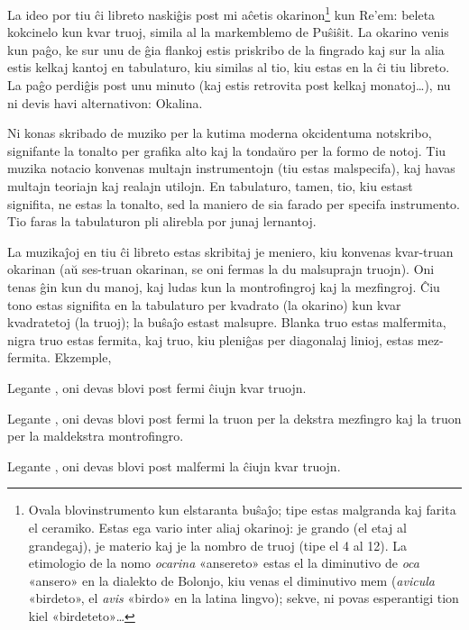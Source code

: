 
La ideo por tiu ĉi libreto naskiĝis post mi aĉetis okarinon\footnote{Ovala blovinstrumento kun elstaranta buŝaĵo; tipe estas malgranda kaj farita el ceramiko. Estas ega vario inter aliaj okarinoj: je grando (el etaj al grandegaj), je materio kaj je la nombro de truoj (tipe el 4 al 12). La etimologio de la nomo \emph{ocarina} «ansereto» estas el la diminutivo de \emph{oca} «ansero» en la dialekto de Bolonjo, kiu venas el diminutivo mem (\emph{avicula} «birdeto», el \emph{avis} «birdo» en la latina lingvo); sekve, ni povas esperantigi tion kiel «birdeteto»…} kun Re’em: beleta kokcinelo kun kvar truoj, simila al la markemblemo de Puŝiŝit. La okarino venis kun paĝo, ke sur unu de ĝia flankoj estis priskribo de la fingrado kaj sur la alia estis kelkaj kantoj en tabulaturo, kiu similas al tio, kiu estas en la ĉi tiu libreto. La paĝo perdiĝis post unu minuto (kaj estis retrovita post kelkaj monatoj…), nu ni devis havi alternativon: Okalina.



Ni konas skribado de muziko per la kutima moderna okcidentuma notskribo, signifante la tonalto per grafika alto kaj la tondaŭro per la formo de notoj. Tiu muzika notacio konvenas multajn instrumentojn (tiu estas malspecifa), kaj havas multajn teoriajn kaj realajn utilojn. En tabulaturo, tamen, tio, kiu estast signifita, ne estas la tonalto, sed la maniero de sia farado per specifa instrumento. Tio faras la tabulaturon pli alirebla por junaj lernantoj.

La muzikaĵoj en tiu ĉi libreto estas skribitaj je meniero, kiu konvenas kvar-truan okarinan (aŭ ses-truan okarinan, se oni fermas la du malsuprajn truojn). Oni tenas ĝin kun du manoj, kaj ludas kun la montrofingroj kaj la mezfingroj. Ĉiu tono estas signifita en la tabulaturo per kvadrato (la okarino) kun kvar kvadratetoj (la truoj); la buŝaĵo estast malsupre. Blanka truo estas malfermita, nigra truo estas fermita, kaj truo, kiu pleniĝas per diagonalaj linioj, estas mez-fermita. Ekzemple,
\begin{compactitem}
	\item Legante \enliniatabulaturo{\c}, oni devas blovi post fermi ĉiujn kvar truojn.
	\item Legante \enliniatabulaturo{\gis}, oni devas blovi post fermi la truon per la dekstra mezfingro kaj la truon per la maldekstra montrofingro.
	\item Legante \enliniatabulaturo{\C}, oni devas blovi post malfermi la ĉiujn kvar truojn.
\end{compactitem}
